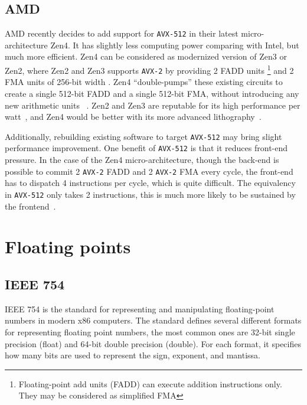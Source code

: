 \documentclass[logo,bsc,singlespacing,parskip]{infthesis}
\begin{document}
\subsection{AMD}
AMD recently decides to add support for \texttt{AVX-512} in their latest
micro-architecture Zen4. It has slightly less computing power comparing with
Intel, but much more efficient. Zen4 can be considered as modernized version of
Zen3 or Zen2, where Zen2 and Zen3 supports \texttt{AVX-2}  by providing 2 FADD
units \footnote{Floating-point add units (FADD) can execute addition
instructions only. They may be considered as simplified FMA} and 2 FMA units of
256-bit width \cite{Zen2ChipWiki}. Zen4 ``double-pumps'' these existing circuits
to create a single 512-bit FADD and a single 512-bit FMA, without introducing
any new arithmetic units ~\cite{Zen4Critique}. Zen2 and Zen3 are reputable for
its high performance per watt~\cite{ZenPerfPerWatt}, and Zen4 would be better
with its more advanced lithography~\cite{Zen4Critique}.

Additionally, rebuilding existing software to target \texttt{AVX-512} may bring
slight performance improvement. One benefit of \texttt{AVX-512} is that it
reduces front-end pressure. In the case of the Zen4 micro-architecture, though
the back-end is possible to commit 2 \texttt{AVX-2} FADD and 2 \texttt{AVX-2}
FMA every cycle, the front-end has to dispatch 4 instructions per cycle, which
is quite difficult. The equivalency in \texttt{AVX-512} only takes 2
instructions, this is much more likely to be sustained by the
frontend~\cite{Zen4Critique}.


\section{Floating points}
\label{sec:i23}
\subsection{IEEE 754}
\label{sec:IEEE754}
IEEE 754 is the standard for representing and manipulating floating-point
numbers in modern x86 computers. The standard defines several different formats
for representing floating point numbers, the most common ones are 32-bit single
precision (float) and 64-bit double precision (double). For each format, it
specifies how many bits are used to represent the sign, exponent, and mantissa. 
\end{document}
